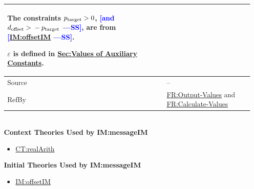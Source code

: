 \documentclass[12pt]{article}
\newcommand{\authornote}[3]{\textcolor{#1}{[#3 ---#2]}}
\newcommand{\authornote}[3]{}
\newcommand{\wss}[1]{\authornote{blue}{SS}{#1}}
\newcommand{\gt}{\ensuremath >}
\begin{document}
\begin{minipage}{\textwidth}
\begin{tabular}{>{\raggedright}p{}>{\raggedright\arraybackslash}p{}}
        The constraints ${p_{\text{target}}}\gt{}0$, \wss{and
        ${d_{\text{offset}}}\gt{}-{p_{\text{target}}}$}, are from
        \wss{\hyperref[IM:offsetIM]{IM:offsetIM}}.
        
        $ε$ is defined in \hyperref[Sec:AuxConstants]{Sec:Values of Auxiliary Constants}.
        
\\ \midrule
Source & --
         
\\ \midrule
RefBy & \hyperref[outputValues]{FR:Output-Values} and \hyperref[calcValues]{FR:Calculate-Values}
        
\\ \bottomrule
\end{tabular}
\end{minipage}
~\\

\noindent \textbf{Context Theories Used by IM:messageIM}

\begin{itemize}
\item \hyperref[CT:realArith]{CT:realArith}
\end{itemize}

\noindent \textbf{Initial Theories Used by IM:messageIM}

\begin{itemize}
\item \hyperref[IM:offsetIM]{IM:offsetIM}
\end{itemize}
\end{document}
